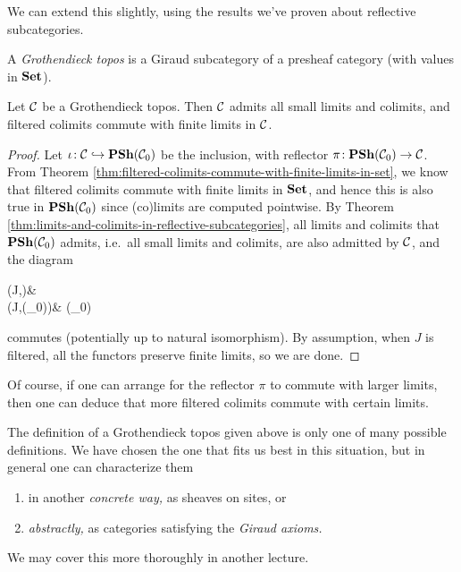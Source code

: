 We can extend this slightly, using the results we've proven about reflective subcategories.
\begin{definition}
	A \emph{Grothendieck topos} is a Giraud subcategory of a presheaf category (with values in \(\mathbf{Set}\)).
\end{definition}
\begin{corollary}
	Let \(\mathcal{C}\) be a Grothendieck topos. Then \(\mathcal{C}\) admits all small limits and colimits, and filtered colimits commute with finite limits in \(\mathcal{C}\).
\end{corollary}
\begin{proof}
Let \(\iota\!:\mathcal{C}\hookrightarrow\operatorname{\mathbf{PSh}}(\mathcal{C}_0)\) be the inclusion, with reflector \(\pi\!:\operatorname{\mathbf{PSh}}(\mathcal{C}_0)\to\mathcal{C}\). From Theorem \ref{thm:filtered-colimits-commute-with-finite-limits-in-set}, we know that filtered colimits
commute with finite limits in \(\mathbf{Set}\), and hence this is also true in \(\operatorname{\mathbf{PSh}}(\mathcal{C}_0)\) since (co)limits are computed pointwise. By Theorem \ref{thm:limits-and-colimits-in-reflective-subcategories}, all
limits and colimits that \(\operatorname{\mathbf{PSh}}(\mathcal{C}_0)\) admits, i.e.\ all small limits and colimits, are also admitted by \(\mathcal{C}\), and the diagram
\begin{diagram*}
	\Fun(J,\calC)\ar[r,"\injlim"] & \calC \\
	\Fun(J,\PSh(\calC_0))\ar[r,"\injlim"] & \PSh(\calC_0)\ar[u,"\pi"]
\end{diagram*}
commutes (potentially up to natural isomorphism). By assumption, when \(J\) is filtered, all the functors preserve finite limits, so we are done.
\end{proof}
\begin{remark}
	Of course, if one can arrange for the reflector \(\pi\) to commute with larger limits, then one can deduce that more filtered colimits commute with certain limits.
\end{remark}
\begin{remark}
	The definition of a Grothendieck topos given above is only one of many possible definitions. We have chosen the one that fits us best in this situation, but in general
	one can characterize them
	\begin{enumerate}[label=(\arabic*)]
	\item in another \emph{concrete way,} as sheaves on sites, or
	\item \emph{abstractly,} as categories satisfying the \emph{Giraud axioms.}
	\end{enumerate}
	We may cover this more thoroughly in another lecture.
\end{remark}
